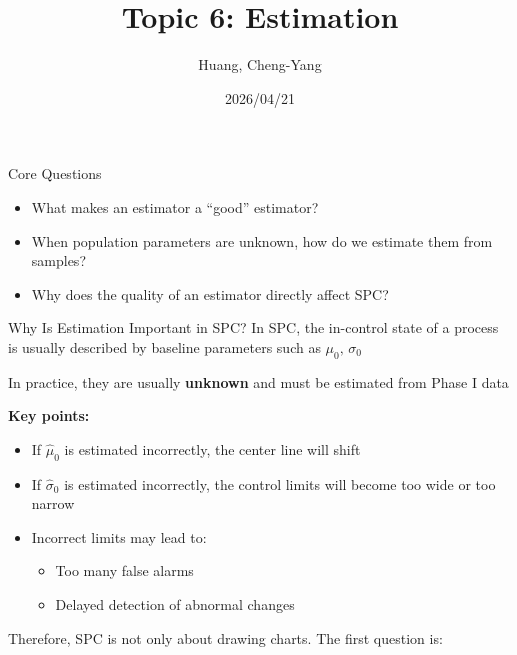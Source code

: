 \documentclass[aspectratio=169,12pt]{beamer}
\title{Topic 6: Estimation}
\author{Huang, Cheng-Yang}
\institute{Statistics (III) Midterm}
\date{2026/04/21}
\begin{document}
\begin{frame}
    \titlepage
\end{frame}

\begin{frame}{Core Questions} %
    \vspace{-2cm}
    \begin{itemize}
        \item What makes an estimator a ``good'' estimator?
        \item When population parameters are unknown, how do we estimate them from samples? 
        \item Why does the quality of an estimator directly affect SPC?
    \end{itemize}
\end{frame}

\begin{frame}{Why Is Estimation Important in SPC?}
    In SPC, the in-control state of a process is usually described by baseline parameters such as $\mu_0,\, \sigma_0$

    \vspace{0.8em}
    In practice, they are usually \textbf{unknown} and must be estimated from Phase I data

    \vspace{0.8em}
    \textbf{Key points:}
        \begin{itemize}
            \item If $\hat{\mu}_0$ is estimated incorrectly, the center line will shift
            \item If $\hat{\sigma}_0$ is estimated incorrectly, the control limits will become too wide or too narrow
            \item Incorrect limits may lead to: 
            \begin{itemize}
                \item Too many false alarms
                \item Delayed detection of abnormal changes
            \end{itemize}
        \end{itemize}

    Therefore, SPC is not only about drawing charts. The first question is:

\end{frame}
\end{document}
